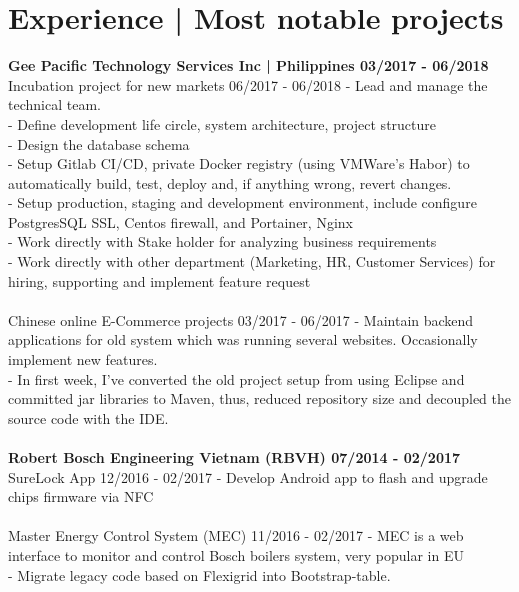 \section*{Experience | \small{Most notable projects}}
{%
  \textbf{\event
    {Gee Pacific Technology Services Inc | Philippines}
    {03/2017 - 06/2018}
    {}
  }
  \event
  {Incubation project for new markets}
  {06/2017 - 06/2018}
  {
    - Lead and manage the technical team. \\
    - Define development life circle, system architecture, project structure\\
    - Design the database schema\\
    - Setup Gitlab CI/CD, private Docker registry (using VMWare's Habor) to
    automatically build, test, deploy and, if anything wrong, revert changes.\\
    - Setup production, staging and development environment, include
    configure PostgresSQL SSL, Centos firewall, and Portainer, Nginx\\
    - Work directly with Stake holder for analyzing business requirements\\
    - Work directly with other department (Marketing, HR, Customer Services)
    for hiring, supporting and implement feature request
  }
  \\
  \\
  \event
  {Chinese online E-Commerce projects}
  {03/2017 - 06/2017}
  {
    - Maintain backend applications for old system which was running several
    websites. Occasionally implement new features.\\
    - In first week, I've converted the old project setup from using Eclipse
    and committed jar libraries to Maven, thus, reduced repository size and
    decoupled the source code with the IDE.
  }
  \\
  \\
  \textbf{\event
    {Robert Bosch Engineering Vietnam (RBVH)}
    {07/2014 - 02/2017}
    {}
  }
  \event
  {SureLock App}
  {12/2016  - 02/2017}
  {
    - Develop Android app to flash and upgrade chips firmware via NFC
  }
  \\
  \\
  \event
  {Master Energy Control System (MEC)}
  {11/2016 - 02/2017}
  {
    - MEC is a web interface to monitor and control Bosch boilers system,
    very popular in EU\\
    - Migrate legacy code based on Flexigrid into Bootstrap-table.
}}
